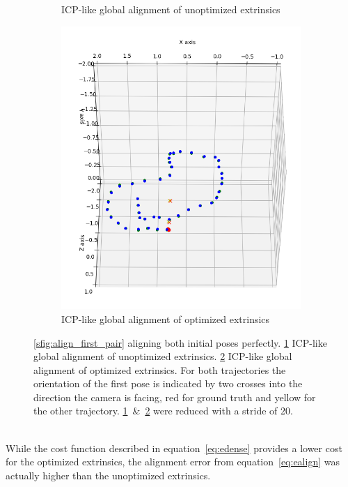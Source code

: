 \begin{figure}[ht]
\begin{subfigure}[b]{.32\textwidth}
                \caption{ICP-like global alignment of unoptimized extrinsics}
                \label{sfig:align_global}
            \end{subfigure}
            \begin{subfigure}[b]{.32\textwidth}
                \includegraphics[width=.95\textwidth]{images/align_global_opt}
                \caption{ICP-like global alignment of optimized extrinsics}
                \label{sfig:align_global_opt}
            \end{subfigure}
            \caption[]{\ref{sfig:align_first_pair} aligning both initial poses perfectly. \ref{sfig:align_global} ICP-like global alignment of unoptimized extrinsics. \ref{sfig:align_global_opt} ICP-like global alignment of optimized extrinsics. For both trajectories the orientation of the first pose is indicated by two crosses into the direction the camera is facing, red for ground truth and yellow for the other trajectory. \ref{sfig:align_global}~\&~\ref{sfig:align_global_opt} were reduced with a stride of 20.}
            \label{fig:traj_alignment}
        \end{figure}\\
        While the cost function described in equation~\ref{eq:edense} provides a lower cost for the optimized extrinsics, the alignment error from equation~\ref{eq:ealign} was actually higher than the unoptimized extrinsics.
